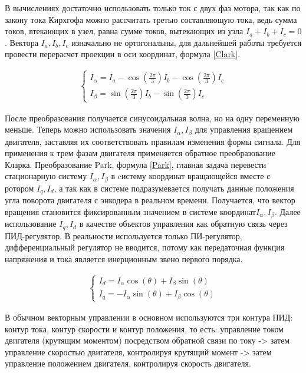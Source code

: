 В вычислениях достаточно использовать только ток с двух фаз мотора, так как по закону тока Кирхгофа можно рассчитать третью составляющую тока, ведь сумма токов, втекающих в узел, равна сумме токов, вытекающих из узла $I_a+I_b+I_c=0$. Вектора $I_a,I_b,I_c$ изначально не ортогональны, для дальнейшей работы требуется провести перерасчет проекции в оси координат, формула \ref{Clark}.
\begin{ceqn}
	\begin{align} \label{Clark}
		\begin{cases}
			I_{\alpha} = I_a - \cos\left(\frac{2\pi}{3}\right) I_b - \cos\left(\frac{2\pi}{3}\right) I_c \\
			I_{\beta} = \sin\left(\frac{2\pi}{3}\right) I_b - \sin\left(\frac{2\pi}{3}\right) I_c
		\end{cases}
	\end{align}
\end{ceqn}

После преобразования получается синусоидальная волна, но на одну переменную меньше. Теперь можно использовать значения $I_\alpha,I_\beta$ для управления вращением двигателя, заставляя их соответствовать правилам изменения формы сигнала. Для применения к трем фазам двигателя применяется обратное преобразование Кларка.
Преобразование Park, формула \ref{Park}, главная задача перевести стационарную систему $I_\alpha,I_\beta$ в cистему координат вращающейся вместе с ротором $I_q,I_d$, а так как в системе подразумевается получать данные положения угла поворота двигателя с энкодера в реальном времени. Получается, что вектор вращения становится фиксированным значением в системе координат$I_\alpha,I_\beta$.  Далее использование $I_q,I_d$ в качестве объектов управления как обратную связь через ПИД-регулятор. В реальности используется только ПИ-регулятор, дифференциальный регулятор не вводится, потому как передаточная функция напряжения и тока является инерционным звено первого порядка.

\begin{ceqn}
	\begin{align} \label{Park}
		\begin{cases}
			I_d = I_\alpha \cos(\theta) + I_\beta \sin(\theta) \\
			I_q = -I_\alpha \sin(\theta) + I_\beta \cos(\theta)
		\end{cases}
	\end{align}
\end{ceqn}


В обычном векторным управлении в основном используются три контура ПИД: контур тока, контур скорости и контур положения, то есть: управление током двигателя (крутящим моментом) посредством обратной связи по току -> затем управление скоростью двигателя, контролируя крутящий момент -> затем управление положением двигателя, контролируя скорость двигателя.


